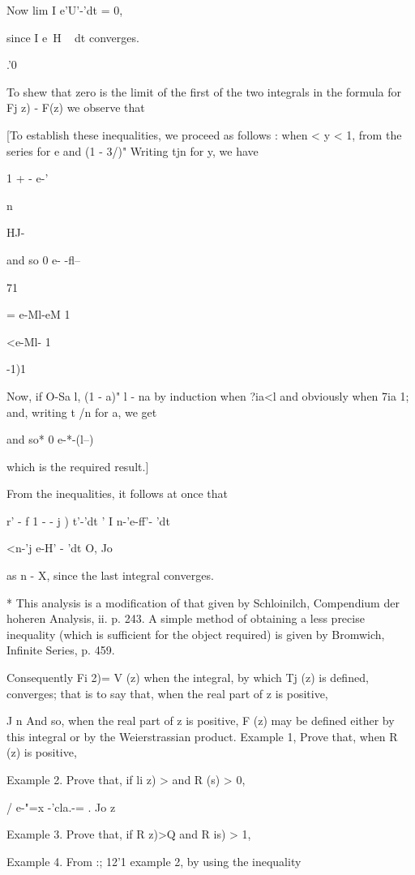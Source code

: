 Now lim I e'U'-'dt = 0,

since I e~H ~ dt converges.

.'0

To shew that zero is the limit of the first of the two integrals in
the formula for Fj z) - F(z) we observe that

[To establish these inequalities, we proceed as follows : when < y <
1, from the series for e and (1 - 3/)" Writing tjn for y, we have

1 + - e-'

n

HJ-

and so 0 e- -fl--

71

= e-Ml-eM 1

<e-Ml- 1

-1)1

Now, if O-Sa l, (1 - a)" l - na by induction when ?ia<l and obviously
when 7ia 1; and, writing t /n for a, we get

and so* 0 e-*-(l--) %

which is the required result.]

From the inequalities, it follows at once that

r' - f 1 - - j ) t'-'dt ' I n-'e-ff'- 'dt

<n-'j e-H' - 'dt O, Jo

as n - X, since the last integral converges.

* This analysis is a modification of that given by Schloinilch,
Compendium der hoheren Analysis, ii. p. 243. A simple method of
obtaining a less precise inequality (which is sufficient for the
object required) is given by Bromwich, Infinite Series, p. 459.

%
%

Consequently Fi 2)= V (z) when the integral, by which Tj (z) is
defined, converges; that is to say that, when the real part of z is
positive,

J n And so, when the real part of z is positive, F (z) may be defined
either by this integral or by the Weierstrassian product. Example 1,
Prove that, when R (z) is positive,

Example 2. Prove that, if li z) > and R (s) > 0,

/ e-"=x -'cla.-= . Jo z

Example 3. Prove that, if R z)>Q and R is) > 1,

Example 4. From :; 12'1 example 2, by using the inequality

